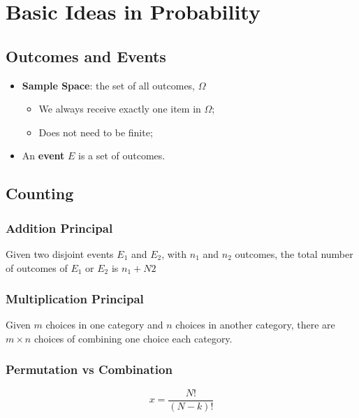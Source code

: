 \chapter{Basic Ideas in Probability}

\section{Outcomes and Events}

  \begin{itemize}
    \item \textbf{Sample Space}: the set of all outcomes, $ \Omega $ \\ 
    \begin{itemize}
      \item We always receive exactly one item in $ \Omega $;
      \item Does not need to be finite;
    \end{itemize}
    
    \item An \textbf{event} $ E $ is a set of outcomes.
  \end{itemize}
  
\section{Counting}

  \subsection{Addition Principal}
  
    Given two disjoint events $ E_{1} $ and $ E_{2} $, with $ n_{1} $ and $ n_{2} $ outcomes, the total number of outcomes of $ E_{1} $ or $ E_{2} $ is $ n_{1} + N{2} $

  \subsection{Multiplication Principal}

    Given $ m $ choices in one category and $ n $ choices in another category, there are $ m \times n $ choices of combining one choice each category.
  
  \subsection{Permutation vs Combination}
    
    \begin{equation}
      x = \frac{N!}{\left( N - k \right)!}
    \end{equation}
  
